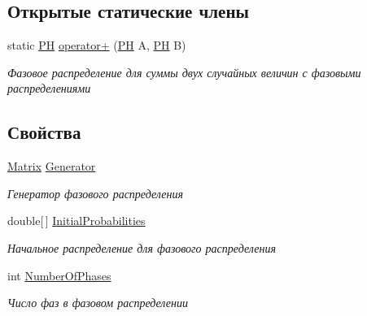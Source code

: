 \subsection*{Открытые статические члены}
\begin{DoxyCompactItemize}
\item 
static \hyperlink{class_phase_type_distribution_1_1_p_h}{PH} \hyperlink{class_phase_type_distribution_1_1_p_h_ae116dda4b8cc0d8eb1d15399166a0152}{operator+} (\hyperlink{class_phase_type_distribution_1_1_p_h}{PH} A, \hyperlink{class_phase_type_distribution_1_1_p_h}{PH} B)
\begin{DoxyCompactList}\small\item\em Фазовое распределение для суммы двух случайных величин с фазовыми распределениями \end{DoxyCompactList}\end{DoxyCompactItemize}
\subsection*{Свойства}
\begin{DoxyCompactItemize}
\item 
\hyperlink{class_b_l_a_s_1_1_matrix}{Matrix} \hyperlink{class_phase_type_distribution_1_1_p_h_a80552346d502e6805f79ea0262fb209f}{Generator}
\begin{DoxyCompactList}\small\item\em Генератор фазового распределения \end{DoxyCompactList}\item 
double\mbox{[}$\,$\mbox{]} \hyperlink{class_phase_type_distribution_1_1_p_h_a987a901d55fcc253f34c42218dbb4456}{Initial\+Probabilities}
\begin{DoxyCompactList}\small\item\em Начальное распределение для фазового распределения \end{DoxyCompactList}\item 
int \hyperlink{class_phase_type_distribution_1_1_p_h_a1cc9a81b38dd0c3f8dfa26a789262fec}{Number\+Of\+Phases}
\begin{DoxyCompactList}\small\item\em Число фаз в фазовом распределении \end{DoxyCompactList}\end{DoxyCompactItemize}


